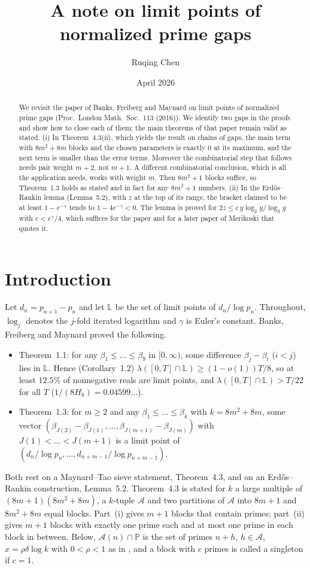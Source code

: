 \documentclass[11pt,a4paper]{amsart}
\title[Limit points of normalized prime gaps]{A note on limit points of normalized prime gaps}
\author{Ruqing Chen}
\date{April 2026}
\theoremstyle{remark}
\newcommand{\cA}{\mathcal{A}}
\newcommand{\PP}{\mathbb{P}}
\begin{document}
\begin{abstract}
We revisit the paper of Banks, Freiberg and Maynard on limit points of normalized prime gaps
(Proc.\ London Math.\ Soc.\ 113 (2016)). We identify two gaps in the proofs and show how to close each of them;
the main theorems of that paper remain valid as stated.
(i) In Theorem~4.3(ii), which yields the result on chains of gaps, the main term with $8m^2+8m$ blocks and the
chosen parameters is exactly $0$ at its maximum, and the next term is smaller than the error terms. Moreover the
combinatorial step that follows needs pair weight $m+2$, not $m+1$. A different combinatorial conclusion, which is all the application
needs, works with weight $m$. Then $8m^2+1$ blocks suffice, so Theorem~1.3 holds as stated and in fact for any $8m^2+1$ numbers.
(ii) In the Erd\H{o}s--Rankin lemma (Lemma~5.2), with $z$ at the top of its range, the bracket claimed to be at least
$1-e^{-\gamma}$ tends to $1-4e^{-\gamma}<0$. The lemma is proved for $2z\le c\,y\log_2y/\log_3y$ with $c<e^\gamma/4$,
which suffices for the paper and for a later paper of Merikoski that quotes it.
\end{abstract}
\maketitle

\section{Introduction}

Let $d_n=p_{n+1}-p_n$ and let $\mathbb L$ be the set of limit points of $d_n/\log p_n$. Throughout, $\log_j$ denotes
the $j$-fold iterated logarithm and $\gamma$ is Euler's constant. Banks, Freiberg and Maynard
\cite{BFM} proved the following.
\begin{itemize}
\item Theorem~1.1: for any $\beta_1\le\dots\le\beta_9$ in $[0,\infty)$, some difference $\beta_j-\beta_i$ ($i<j$)
lies in $\mathbb L$. Hence (Corollary~1.2) $\lambda([0,T]\cap\mathbb L)\ge(1-o(1))T/8$, so at least $12.5\%$ of
nonnegative reals are limit points, and $\lambda([0,T]\cap\mathbb L)>T/22$ for all $T$ ($1/(8H_8)=0.04599\ldots$).
\item Theorem~1.3: for $m\ge2$ and any $\beta_1\le\dots\le\beta_k$ with $k=8m^2+8m$, some vector
$(\beta_{J(2)}-\beta_{J(1)},\dots,\beta_{J(m+1)}-\beta_{J(m)})$ with $J(1)<\dots<J(m+1)$ is a limit point of
$(d_n/\log p_n,\dots,d_{n+m-1}/\log p_{n+m-1})$.
\end{itemize}
Both rest on a Maynard--Tao sieve statement, Theorem~4.3, and on an Erd\H{o}s--Rankin construction, Lemma~5.2.
Theorem~4.3 is stated for $k$ a large multiple of $(8m+1)(8m^2+8m)$, a $k$-tuple $\cA$ and two partitions of
$\cA$ into $8m+1$ and $8m^2+8m$ equal blocks. Part~(i) gives $m+1$ blocks that contain primes; part~(ii) gives $m+1$
blocks with exactly one prime each and at most one prime in each block in between. Below, $\cA(n)\cap\PP$ is the set of primes
$n+h$, $h\in\cA$, $x=\rho\delta\log k$ with $0<\rho<1$ as in \cite[Lemma~4.6]{BFM}, and a block with $c$ primes
is called a singleton if $c=1$.
\end{document}
